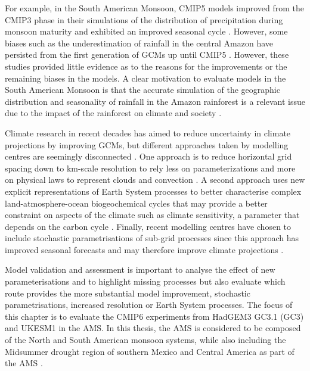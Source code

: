 For example, in the South American Monsoon, CMIP5 models improved from the CMIP3 phase in their simulations of the distribution of precipitation during monsoon maturity and exhibited an improved seasonal cycle \citep{jones2013,yin2013}. However, some biases such as the underestimation of rainfall in the central Amazon have persisted from the first generation of GCMs up until CMIP5 \citep{li2006,yin2013}.  However, these studies provided little evidence as to the reasons for the improvements or the remaining biases in the models. 
A clear motivation to evaluate models in the South American Monsoon is that the accurate simulation of the geographic distribution and seasonality of rainfall in the Amazon rainforest is a relevant issue due to the impact of the rainforest on climate and society \citep[e.g.][]{li2006,Malhi20610,yin2013}.

Climate research in recent decades has aimed to reduce uncertainty in climate projections by improving GCMs, but different approaches taken by modelling centres are seemingly disconnected \citep{jakob2014}. One approach is to reduce horizontal grid spacing down to km-scale resolution to rely less on parameterizations and more on physical laws to represent clouds and convection \citep{palmer2019}. A second approach uses new explicit representations of Earth System processes to better characterise complex land-atmosphere-ocean biogeochemical cycles that may provide a better constraint on aspects of the climate such as climate sensitivity, a parameter that depends on the carbon cycle \citep{marotzke2017,sellar2019,andrews2019}. Finally, recent modelling centres have chosen to include  stochastic  parametrisations of sub-grid processes since this approach has improved seasonal forecasts and may therefore improve climate projections \citep{palmer2019st}. 

Model validation and assessment is important to analyse the effect of new parameterisations and to highlight missing processes but also evaluate which route provides the more substantial model improvement, stochastic parametrisations, increased resolution or Earth System processes.
The focus of this chapter is to evaluate the CMIP6 experiments from HadGEM3 GC3.1 (GC3) and UKESM1 in the AMS. In this thesis, the AMS is considered to be composed of the North and South American monsoon systems, while also including the Midsummer drought region of southern Mexico and Central America as part of the AMS \citep[as in e.g.][]{vera2006,pascale2019}.

